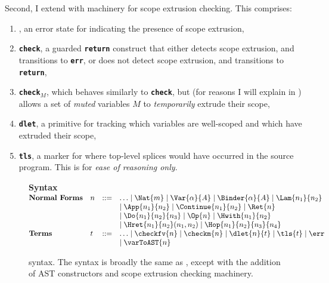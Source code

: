 Second, I extend \efflang{} with machinery for scope extrusion checking. This comprises:
\begin{enumerate}
\item \err{}, an error state for indicating the presence of scope extrusion,
\item \textbf{\texttt{check}}, a guarded \textbf{\texttt{return}} construct that either detects scope extrusion, and transitions to \textbf{\texttt{err}}, or does not detect scope extrusion, and transitions to \textbf{\texttt{return}},
\item \textbf{\texttt{check$_M$}}, which behaves similarly to \textbf{\texttt{check}}, but (for reasons I will explain in ) allows a set of \textit{muted} variables $M$ to \textit{temporarily} extrude their scope,
\item \textbf{\texttt{dlet}}, a primitive for tracking which variables are well-scoped and which have extruded their scope,
\item \textbf{\texttt{tls}}, a marker for where top-level splices would have occurred in the source program. This is for \textit{ease of reasoning only}. 
\end{enumerate}

\begin{figure}
\begin{core-desc}
  {\large \textbf{Syntax}} \\

  $\begin{array}{@{}llll}
    \textbf{Normal Forms} & n & ::= & \ldots \mid \Nat{m} \mid \Var{\alpha}{A} \mid \Binder{\alpha}{A} \mid \Lam{n_1}{n_2}  \\ 
  &&&\mid \App{n_1}{n_2} \mid \Continue{n_1}{n_2} \mid \Ret{n}   \\ 
  &&& \mid \Do{n_1}{n_2}{n_3} \mid \Op{n} \mid \Hwith{n_1}{n_2}   \\
  &&&\mid \Hret{n_1}{n_2}(n_1, n_2) \mid \Hop{n_1}{n_2}{n_3}{n_4} \\
  \textbf{Terms} & t & ::= & \ldots \mid \checkfv{n} \mid \checkm{n} \mid \dlet{n}{t} \mid \tls{t} \mid \err \\ &&& \mid \varToAST{n}
  \end{array}$
\end{core-desc}
\caption{\coreLang{} syntax. The syntax is broadly the same as \efflang{}, except with the addition of AST constructors and scope extrusion checking machinery.}
\label{fig:source-syntax}
\end{figure}

